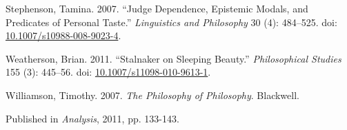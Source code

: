 \documentclass[
  11pt,
  letterpaper,
  DIV=11,
  numbers=noendperiod,
  twoside]{scrartcl}
\newlength{\cslhangindent}
\newenvironment{CSLReferences}[2] %
 {\begin{list}{}{%
  \setlength{\itemindent}{0pt}
  \setlength{\leftmargin}{0pt}
  \setlength{\parsep}{0pt}
  \ifodd #1
   \setlength{\leftmargin}{\cslhangindent}
   \setlength{\itemindent}{-1\cslhangindent}
  \fi
  \setlength{\itemsep}{#2\baselineskip}}}
 {\end{list}}
\begin{document}
\begin{CSLReferences}{1}{0}
Stephenson, Tamina. 2007. {``Judge Dependence, Epistemic Modals, and
Predicates of Personal Taste.''} \emph{Linguistics and Philosophy} 30
(4): 484--525. doi:
\href{https://doi.org/10.1007/s10988-008-9023-4}{10.1007/s10988-008-9023-4}.

Weatherson, Brian. 2011. {``Stalnaker on Sleeping Beauty.''}
\emph{Philosophical Studies} 155 (3): 445--56. doi:
\href{https://doi.org/10.1007/s11098-010-9613-1}{10.1007/s11098-010-9613-1}.

Williamson, Timothy. 2007. \emph{{The Philosophy of Philosophy}}.
Blackwell.

\end{CSLReferences}



\noindent Published in\emph{
Analysis}, 2011, pp. 133-143.
\end{document}
